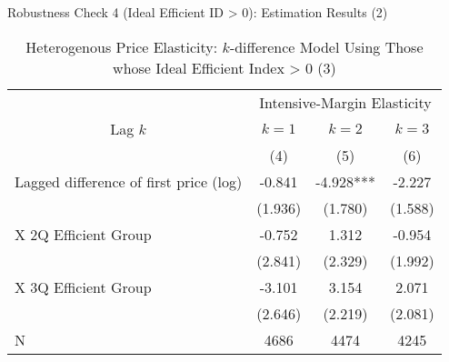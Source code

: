 \documentclass[
  ignorenonframetext,
]{beamer}
\begin{document}
\begin{frame}{Robustness Check 4 (Ideal Efficient ID \textgreater{} 0): Estimation Results (2)}
\protect\hypertarget{robustness-check-4-ideal-efficient-id-0-estimation-results-2}{}
\begin{table}

\caption{\label{tab:kableSubsetHeterokDiffElasticitySlide3}Heterogenous Price Elasticity: $k$-difference Model Using Those whose Ideal Efficient Index > 0 (3)}
\centering
\fontsize{8}{10}\selectfont
\begin{tabular}[t]{lccc}
\toprule
\multicolumn{1}{c}{ } & \multicolumn{3}{c}{Intensive-Margin Elasticity} \\
\cmidrule(l{3pt}r{3pt}){2-4}
\multicolumn{1}{c}{Lag $k$} & \multicolumn{1}{c}{$k = 1$} & \multicolumn{1}{c}{$k = 2$} & \multicolumn{1}{c}{$k = 3$} \\
\cmidrule(l{3pt}r{3pt}){1-1} \cmidrule(l{3pt}r{3pt}){2-2} \cmidrule(l{3pt}r{3pt}){3-3} \cmidrule(l{3pt}r{3pt}){4-4}
 & (4) & (5) & (6)\\
\midrule
Lagged difference of first price (log) & -0.841 & -4.928*** & -2.227\\
 & (1.936) & (1.780) & (1.588)\\
\hspace{1em}X 2Q Efficient Group & -0.752 & 1.312 & -0.954\\
 & (2.841) & (2.329) & (1.992)\\
\hspace{1em}X 3Q Efficient Group & -3.101 & 3.154 & 2.071\\
 & (2.646) & (2.219) & (2.081)\\
N & 4686 & 4474 & 4245\\
\bottomrule
\end{tabular}
\end{table}
\end{frame}
\end{document}
